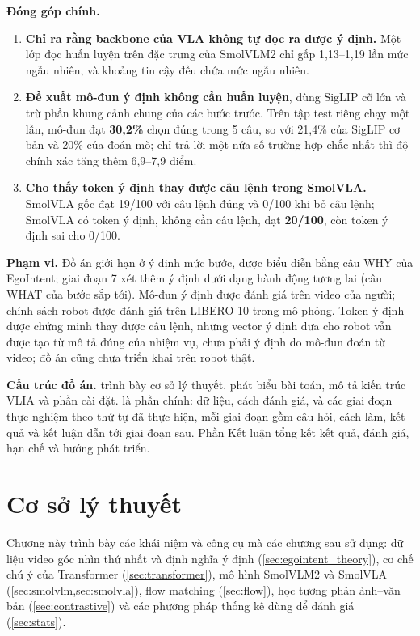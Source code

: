 \documentclass[a4paper,oneside]{report}
\begin{document}
\textbf{Đóng góp chính.}
\begin{enumerate}
  \item \textbf{Chỉ ra rằng backbone của VLA không tự đọc ra được ý định.} Một lớp đọc huấn luyện trên đặc trưng của SmolVLM2 chỉ gấp 1,13--1,19 lần mức ngẫu nhiên, và khoảng tin cậy đều chứa mức ngẫu nhiên.
  \item \textbf{Đề xuất mô-đun ý định không cần huấn luyện}, dùng SigLIP cỡ lớn và trừ phần khung cảnh chung của các bước trước. Trên tập test riêng chạy một lần, mô-đun đạt \textbf{30,2\%} chọn đúng trong 5 câu, so với 21,4\% của SigLIP cơ bản và 20\% của đoán mò; chỉ trả lời một nửa số trường hợp chắc nhất thì độ chính xác tăng thêm 6,9--7,9 điểm.
  \item \textbf{Cho thấy token ý định thay được câu lệnh trong SmolVLA.} SmolVLA gốc đạt 19/100 với câu lệnh đúng và 0/100 khi bỏ câu lệnh; SmolVLA có token ý định, không cần câu lệnh, đạt \textbf{20/100}, còn token ý định sai cho 0/100.
\end{enumerate}

\textbf{Phạm vi.} Đồ án giới hạn ở ý định mức bước, được biểu diễn bằng câu WHY của EgoIntent; giai đoạn 7 xét thêm ý định dưới dạng hành động tương lai (câu WHAT của bước sắp tới). Mô-đun ý định được đánh giá trên video của người; chính sách robot được đánh giá trên LIBERO-10 trong mô phỏng. Token ý định được chứng minh thay được câu lệnh, nhưng vector ý định đưa cho robot vẫn được tạo từ mô tả đúng của nhiệm vụ, chưa phải ý định do mô-đun đoán từ video; đồ án cũng chưa triển khai trên robot thật.

\textbf{Cấu trúc đồ án.}  trình bày cơ sở lý thuyết.  phát biểu bài toán, mô tả kiến trúc VLIA và phần cài đặt.  là phần chính: dữ liệu, cách đánh giá, và các giai đoạn thực nghiệm theo thứ tự đã thực hiện, mỗi giai đoạn gồm câu hỏi, cách làm, kết quả và kết luận dẫn tới giai đoạn sau. Phần Kết luận tổng kết kết quả, đánh giá, hạn chế và hướng phát triển.

\chapter{Cơ sở lý thuyết}
\label{chap:lythuyet}

Chương này trình bày các khái niệm và công cụ mà các chương sau sử dụng: dữ liệu video góc nhìn thứ nhất và định nghĩa ý định (\cref{sec:egointent_theory}), cơ chế chú ý của Transformer (\cref{sec:transformer}), mô hình SmolVLM2 và SmolVLA (\cref{sec:smolvlm,sec:smolvla}), flow matching (\cref{sec:flow}), học tương phản ảnh--văn bản (\cref{sec:contrastive}) và các phương pháp thống kê dùng để đánh giá (\cref{sec:stats}).
\end{document}
